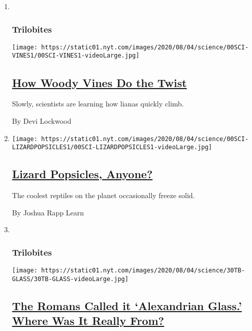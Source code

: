 \begin{enumerate}
\def\labelenumi{\arabic{enumi}.}
\item ~
  \hypertarget{trilobites-1}{%
  \subsubsection{Trilobites}\label{trilobites-1}}

  \texttt{[image: https://static01.nyt.com/images/2020/08/04/science/00SCI-VINES1/00SCI-VINES1-videoLarge.jpg]}

  \hypertarget{how-woody-vines-do-the-twist}{%
  \subsection{\texorpdfstring{\href{/2020/08/01/science/vines-lianas-panama.html}{How
  Woody Vines Do the
  Twist}}{How Woody Vines Do the Twist}}\label{how-woody-vines-do-the-twist}}

  Slowly, scientists are learning how lianas quickly climb.

  By Devi Lockwood
\item
  \texttt{[image: https://static01.nyt.com/images/2020/08/04/science/00SCI-LIZARDPOPSICLES1/00SCI-LIZARDPOPSICLES1-videoLarge.jpg]}

  \hypertarget{lizard-popsicles-anyone}{%
  \subsection{\texorpdfstring{\href{/2020/07/31/science/lizards-liolaemus-argentina.html}{Lizard
  Popsicles,
  Anyone?}}{Lizard Popsicles, Anyone?}}\label{lizard-popsicles-anyone}}

  The coolest reptiles on the planet occasionally freeze solid.

  By Joshua Rapp Learn
\item ~
  \hypertarget{trilobites-2}{%
  \subsubsection{Trilobites}\label{trilobites-2}}

  \texttt{[image: https://static01.nyt.com/images/2020/08/04/science/30TB-GLASS/30TB-GLASS-videoLarge.jpg]}

  \hypertarget{the-romans-called-it-alexandrian-glass-where-was-it-really-from}{%
  \subsection{\texorpdfstring{\href{/2020/07/31/science/alexandrian-glass-rome.html}{The
  Romans Called it `Alexandrian Glass.' Where Was It Really
  From?}}{The Romans Called it `Alexandrian Glass.' Where Was It Really From?}}\label{the-romans-called-it-alexandrian-glass-where-was-it-really-from}}


\end{enumerate}
